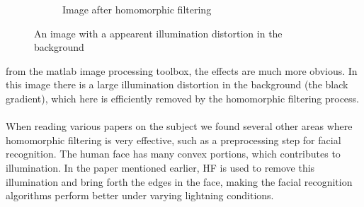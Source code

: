 \begin{figure}[h!]
\begin{subfigure}[b]{0.5\linewidth}
                \caption{Image after homomorphic filtering}
                \label{fig:microbe_after}
        \end{subfigure}
        \caption{An image with a appearent illumination distortion in the background}	
        \label{fig:gamma_diff}
		\end{figure}
		from the matlab image processing toolbox, the effects are much more obvious. 
		In this image there is a large illumination
		distortion in the background (the black gradient), which here is efficiently 
		removed by the homomorphic filtering process. \\
		\\
		When reading various papers on the
		subject we found several other areas where homomorphic filtering is very effective,
		such as a preprocessing step for facial recognition. The human face has many convex
		portions, which contributes to illumination. In the paper mentioned earlier, HF
		is used to remove this illumination and bring forth the edges in the face, making
		the facial recognition algorithms perform better under varying lightning conditions.
%  
